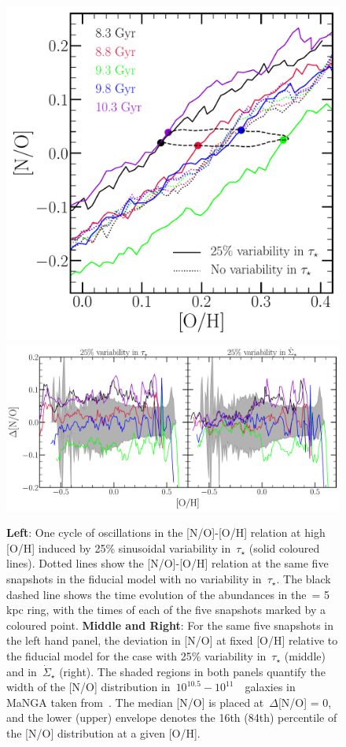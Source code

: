 \documentclass[ms.tex]{subfiles}
\begin{document}
\begin{figure} 
\centering 
\includegraphics[scale = 0.31]{no_oh_sfevar.pdf} 
\includegraphics[scale = 0.33]{delta_no_schaefercomp.pdf} 
\caption{
\textbf{Left}: One cycle of oscillations in the [N/O]-[O/H] relation at high 
[O/H] induced by 25\% sinusoidal variability in~$\tau_\star$ (solid coloured 
lines). 
Dotted lines show the [N/O]-[O/H] relation at the same five snapshots in the 
fiducial model with no variability in~$\tau_\star$. 
The black dashed line shows the time evolution of the abundances in 
the~\rgal = 5 kpc ring, with the times of each of the five snapshots marked by 
a coloured point. 
\textbf{Middle and Right}: For the same five snapshots in the left hand panel, 
the deviation in [N/O] at fixed [O/H] relative to the fiducial model for the 
case with 25\% variability in~$\tau_\star$ (middle) and in~$\dot{\Sigma}_\star$ 
(right). 
The shaded regions in both panels quantify the width of the [N/O] distribution 
in~$10^{10.5} - 10^{11}$~\msun~galaxies in MaNGA taken 
from~\citet{Schaefer2020}. 
The median [N/O] is placed at~$\Delta$[N/O] = 0, and the lower (upper) envelope 
denotes the 16th (84th) percentile of the [N/O] distribution at a given [O/H]. 
} 
\label{fig:schaefer_comp} 
\end{figure} 
\end{document}
